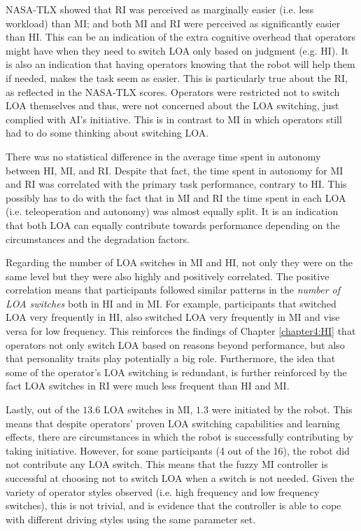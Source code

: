\documentclass[a4paper,12pt,oneside,openright]{bhamthesis}
\begin{document}
NASA-TLX showed that RI was perceived as marginally easier (i.e. less workload) than MI; and both MI and RI were perceived as significantly easier than HI. This can be an indication of the extra cognitive overhead that operators might have when they need to switch LOA only based on judgment (e.g. HI). It is also an indication that having operators knowing that the robot will help them if needed, makes the task seem as easier. This is particularly true about the RI, as reflected in the NASA-TLX scores. Operators were restricted not to switch LOA themselves and thus, were not concerned about the LOA switching, just complied with AI's initiative. This is in contrast to MI in which operators still had to do some thinking about switching LOA.

There was no statistical difference in the average time spent in autonomy between HI, MI, and RI. Despite that fact, the time spent in autonomy for MI and RI was correlated with the primary task performance, contrary to HI. This possibly has to do with the fact that in MI and RI the time spent in each LOA (i.e. teleoperation and autonomy) was almost equally split. It is an indication that both LOA can equally contribute towards performance depending on the circumstances and the degradation factors.

Regarding the number of LOA switches in MI and HI, not only they were on the same level but they were also highly and positively correlated. The positive correlation means that participants followed similar patterns in the \textit{number of LOA switches} both in HI and in MI. For example, participants that switched LOA very frequently in HI, also switched LOA very frequently in MI and vise versa for low frequency. This reinforces the findings of Chapter \ref{chapter4:HI} that operators not only switch LOA based on reasons beyond performance, but also that personality traits play potentially a big role. Furthermore, the idea that some of the operator's LOA switching is redundant, is further reinforced by the fact LOA switches in RI were much less frequent than HI and MI. 

Lastly, out of the $13.6$ LOA switches in MI, $1.3$ were initiated by the robot. This means that despite operators' proven LOA switching capabilities and learning effects, there are circumstances in which the robot is successfully contributing by taking initiative. However, for some participants (4 out of the 16), the robot did not contribute any LOA switch. This means that the fuzzy MI controller is successful at choosing not to switch LOA when a switch is not needed. Given the variety of operator styles observed (i.e. high frequency and low frequency switches), this is not trivial, and is evidence that the controller is able to cope with different driving styles using the same parameter set.
\end{document}
